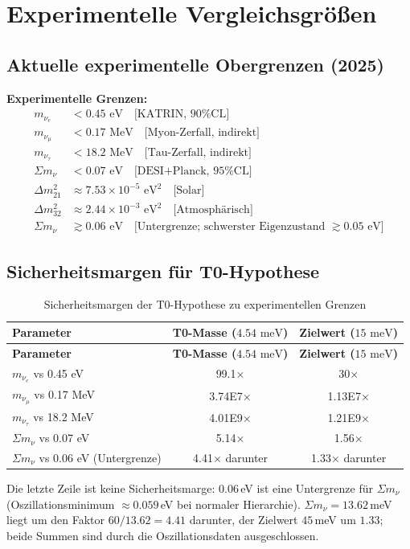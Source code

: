 	\section{Experimentelle Vergleichsgrößen}
	
	\subsection{Aktuelle experimentelle Obergrenzen (2025)}
	
	\begin{experimental}
		\textbf{Experimentelle Grenzen:}
		\begin{align}
			m_{\nu_e} &< 0.45 \text{ eV} \quad \text{[KATRIN, 90\% CL]} \\
			m_{\nu_\mu} &< 0.17 \text{ MeV} \quad \text{[Myon-Zerfall, indirekt]} \\
			m_{\nu_\tau} &< 18.2 \text{ MeV} \quad \text{[Tau-Zerfall, indirekt]} \\
			\Sigma m_\nu &< 0.07 \text{ eV} \quad \text{[DESI+Planck, 95\% CL]} \\
			\Delta m^2_{21} &\approx 7.53 \times 10^{-5} \text{ eV}^2 \quad \text{[Solar]} \\
			\Delta m^2_{32} &\approx 2.44 \times 10^{-3} \text{ eV}^2 \quad \text{[Atmosphärisch]} \\
			\Sigma m_\nu &\gtrsim 0.06 \text{ eV} \quad \text{[Untergrenze; schwerster Eigenzustand } \gtrsim 0.05\text{ eV]}
		\end{align}
	\end{experimental}
	
	\subsection{Sicherheitsmargen für T0-Hypothese}
	
	\begin{longtable}[c]{@{}lcc@{}}
		\caption{Sicherheitsmargen der T0-Hypothese zu experimentellen Grenzen} \\
		\toprule
		\textbf{Parameter} & \textbf{T0-Masse (\(4.54 \text{ meV}\))} & \textbf{Zielwert (\(15 \text{ meV}\))} \\
		\midrule
		\endfirsthead
		\toprule
		\textbf{Parameter} & \textbf{T0-Masse (\(4.54 \text{ meV}\))} & \textbf{Zielwert (\(15 \text{ meV}\))} \\
		\midrule
		\endhead
		$m_{\nu_e}$ vs 0.45 eV & 99.1× & 30× \\
		$m_{\nu_\mu}$ vs 0.17 MeV & 3.74E7× & 1.13E7× \\
		$m_{\nu_\tau}$ vs 18.2 MeV & 4.01E9× & 1.21E9× \\
		\midrule
		$\Sigma m_\nu$ vs 0.07 eV & 5.14× & 1.56× \\
		$\Sigma m_\nu$ vs 0.06 eV (Untergrenze) & 4.41× darunter & 1.33× darunter \\
		\bottomrule
	\end{longtable}
	Die letzte Zeile ist keine Sicherheitsmarge: $0.06$\,eV ist eine Untergrenze für $\Sigma m_\nu$ (Oszillationsminimum $\approx0.059$\,eV bei normaler Hierarchie). $\Sigma m_\nu=13.62$\,meV liegt um den Faktor $60/13.62=4.41$ darunter, der Zielwert $45$\,meV um $1.33$; beide Summen sind durch die Oszillationsdaten ausgeschlossen.
	
